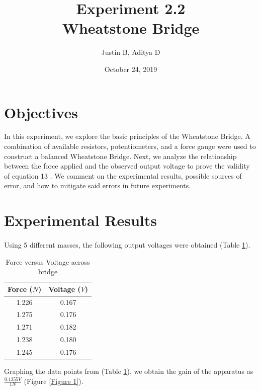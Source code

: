 \documentclass[12pt]{article}
\begin{document}
\title{Experiment 2.2\\Wheatstone Bridge}
\author{Justin B, Aditya D}
\date{October 24, 2019}
\maketitle

\newpage
\tableofcontents
\newpage 
{}

\section{Objectives}
In this experiment, we explore the basic principles of the Wheatstone Bridge.
A combination of available resistors, potentiometers, and a force gauge were used to construct a balanced Wheatstone Bridge.
Next, we analyze the relationship between the force applied and the observed output voltage to prove the validity of equation 13 \cite{labManual}.
We comment on the experimental results, possible sources of error, and how to mitigate said errors in future experiments.

\section{Experimental Results}
\paragraph*{}
Using 5 different masses, the following output voltages were obtained (Table \ref{table:1}).

\begin{table}[h]
\centering
\begin{tabular}{c | c }
    Force (\(N\)) & Voltage (\(V\)) \\
    \hline
    1.226 & 0.167 \\
    1.275 & 0.176 \\
    1.271 & 0.182 \\
    1.238 & 0.180 \\
    1.245 & 0.176 \\
\end{tabular}
\caption{Force versus Voltage across bridge}
\label{table:1}
\end{table}

Graphing the data points from (Table \ref{table:1}), we obtain the gain of the apparatus as \(\frac{0.1355V}{1N}\) (Figure \ref{Figure 1}).
\end{document}
